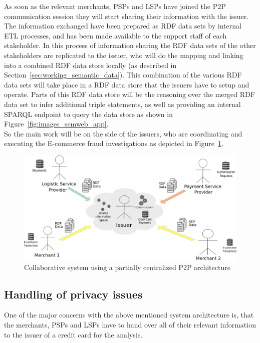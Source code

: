 As soon as the relevant merchants, \gls{PSP}s and \gls{LSP}s have joined the \gls{P2P} communication session they will start sharing their information with the issuer. The information exchanged have been prepared as \gls{RDF} data sets by internal \gls{ETL} processes, and has been made available to the support staff of each stakeholder. In this process of information sharing the \gls{RDF} data sets of the other stakeholders are replicated to the issuer, who will do the mapping and linking into a combined \gls{RDF} data store locally (as described in Section~\ref{sec:working_semantic_data}). This combination of the various \gls{RDF} data sets will take place in a \gls{RDF} data store that the issuers have to setup and operate. Parts of this \gls{RDF} data store will be the reasoning over the merged \gls{RDF} data set to infer additional triple statements, as well as providing an internal \gls{SPARQL} endpoint to query the data store as shown in Figure~\ref{fig:images_semweb_app}. \\

So the main work will be on the side of the issuers, who are coordinating and executing the \gls{E-commerce} fraud investigations as depicted in Figure~\ref{fig:images_p2p_centralized}.\@

\begin{figure}[H]
	\centering
		\includegraphics[width=0.9\columnwidth]{images/system_P2P_centralized.pdf}
	\caption{Collaborative system using a partially centralized \gls{P2P} architecture}
\label{fig:images_p2p_centralized}
\end{figure}


\subsection{Handling of privacy issues}
\label{subsec:p2p_partially_issuer_privacy}

One of the major concerns with the above mentioned system architecture is, that the merchants, \gls{PSP}s and \gls{LSP}s have to hand over all of their relevant information to the issuer of a credit card for the analysis. \\


